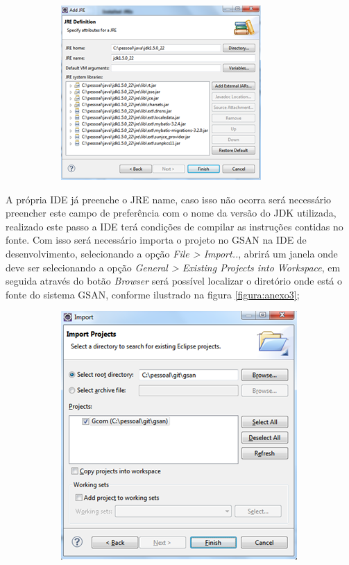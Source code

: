 \begin{apendicesenv}
\begin{figure}[H]
	\centering
	\caption*{\textbf{Adicionar nova JRE na IDE.}}
	\label{figura:anexo2}
	\begin{subfigure}[H]{\textwidth}
		\centering
		\includegraphics{figuras/anexo/addJRE.png}
	\end{subfigure}
\end{figure}

A própria IDE já preenche o JRE name, caso isso não ocorra será necessário preencher este campo de preferência com o nome da versão do JDK utilizada, realizado este passo a IDE terá condições de compilar as instruções contidas no fonte.  Com isso será necessário importa o projeto no GSAN na IDE de desenvolvimento, selecionando a opção \textit{File > Import..}, abrirá um janela onde deve ser selecionando a opção \textit{General > Existing Projects into Workspace}, em seguida através do botão \textit{Browser} será possível localizar o diretório onde está o fonte do sistema GSAN, conforme ilustrado na figura \ref{figura:anexo3};

\begin{figure}[H]
	\centering
	\caption*{\textbf{Importar Sistema GSAN na IDE.}}
	\label{figura:anexo3}
	\begin{subfigure}[H]{\textwidth}
		\centering
		\includegraphics{figuras/anexo/importGSAN.png}
	\end{subfigure}
\end{figure}



\end{apendicesenv}
